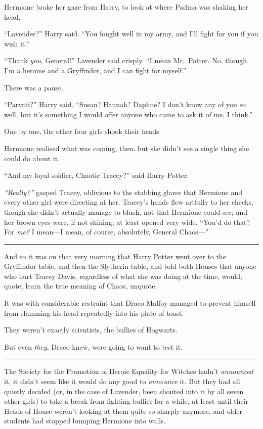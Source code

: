 Hermione broke her gaze from Harry, to look at where Padma was shaking
her head.

``Lavender?'' Harry said. ``You fought well in my army, and I'll fight
for you if you wish it.''

``Thank \emph{you}, General!'' Lavender said crisply. ``I mean
Mr.~Potter. No, though. I'm a heroine and a Gryffindor, and I can fight
for myself.''

There was a pause.

``Parvati?'' Harry said. ``Susan? Hannah? Daphne? I don't know any of
you so well, but it's something I would offer anyone who came to ask it
of me, I think.''

One by one, the other four girls shook their heads.

Hermione realised what was coming, then, but she didn't see a single
thing she could do about it.

``And my loyal soldier, Chaotic Tracey?'' said Harry Potter.

\emph{``Really?''} gasped Tracey, oblivious to the stabbing glares that
Hermione and every other girl were directing at her. Tracey's hands flew
artfully to her cheeks, though she didn't actually manage to blush, not
that Hermione could see; and her brown eyes were, if not shining, at
least opened very wide. ``You'd do that? For \emph{me?} I mean---I mean,
of course, absolutely, General Chaos---''

\begin{center}\rule{3in}{0.4pt}\end{center}

And so it was on that very morning that Harry Potter went over to the
Gryffindor table, and then the Slytherin table, and told both Houses
that anyone who hurt Tracey Davis, regardless of what she was doing at
the time, would, quote, learn the true meaning of Chaos, unquote.

It was with considerable restraint that Draco Malfoy managed to prevent
himself from slamming his head repeatedly into his plate of toast.

They weren't exactly scientists, the bullies of Hogwarts.

But even \emph{they}, Draco knew, were going to want to test it.

\begin{center}\rule{3in}{0.4pt}\end{center}

The Society for the Promotion of Heroic Equality for Witches hadn't
\emph{announced} it, it didn't seem like it would do any good to
\emph{announce} it. But they had all quietly decided (or, in the case of
Lavender, been shouted into it by all seven other girls) to take a break
from fighting bullies for a while, at least until their Heads of House
weren't looking at them quite so sharply anymore, and older students had
stopped bumping Hermione into walls.

